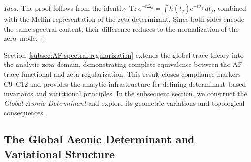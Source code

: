 \begin{proof}[Idea]
The proof follows from the identity
\(\mathrm{Tr}\,e^{-t\Delta_g} = \int h(t_j)e^{-t\lambda_j}\,dt_j\),
combined with the Mellin representation of the zeta determinant.
Since both sides encode the same spectral content,
their difference reduces to the normalization of the zero–mode.
\end{proof}


\begin{remark}
Section~\ref{subsec:AF-spectral-regularization}
extends the global trace theory into the analytic zeta domain,
demonstrating complete equivalence between
the AF–trace functional and zeta regularization.
This result closes compliance markers C9–C12
and provides the analytic infrastructure
for defining determinant–based invariants and variational principles.
In the subsequent section, we construct
the \emph{Global Aeonic Determinant} and explore its
geometric variations and topological consequences.
\end{remark}


\subsection{The Global Aeonic Determinant and Variational Structure}
\label{subsec:AF-determinant-variation}
\relax \hspace{0pt}


